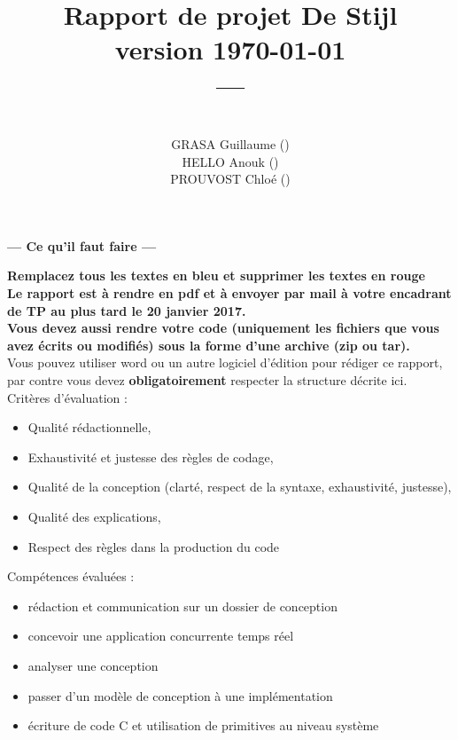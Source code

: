 \documentclass[11pt, a4paper]{paper}
\title{{\Huge Rapport de projet De Stijl}\\
{\large version \today}\\
---\\
}
\author{\color{black}{ABDELMOUMEN Oussama ()} \\ {GRASA Guillaume ()}\\ {HELLO Anouk ()} \\ {PROUVOST Chloé ()} \\
\color{blue}{Exemple : P.-E. Hladik (conception, robot, rédaction du compte-rendu)}
}
\begin{document}
\maketitle


{\color{red}
\begin{framed}
\begin{center}{\bf\Large --- Ce qu'il faut faire --- } \end{center}

{\bf Remplacez tous les textes en bleu et supprimer les textes en rouge}\\


{\bf Le rapport est à rendre en pdf et à envoyer par mail à votre encadrant de TP au plus tard le 20 janvier 2017.}\\

{\bf Vous devez aussi rendre votre code (uniquement les fichiers que vous avez écrits ou modifiés) sous la forme d'une archive (zip ou tar).}\\

Vous pouvez utiliser word ou un autre logiciel d'édition pour rédiger ce rapport, par contre vous devez  {\bf obligatoirement} respecter la structure décrite ici.\\


Critères d'évaluation :
\begin{itemize}
	\item Qualité rédactionnelle,
	\item Exhaustivité et justesse des règles de codage,
	\item Qualité de la conception (clarté, respect de la syntaxe, exhaustivité, justesse),
	\item Qualité des explications,
	\item Respect des règles dans la production du code\\
\end{itemize}

Compétences évaluées :
\begin{itemize}
	\item rédaction et communication sur un dossier de conception
	\item concevoir une application concurrente temps réel
	\item analyser une conception
	\item passer d'un modèle de conception à une implémentation
	\item écriture de code C et utilisation de primitives au niveau système
\end{itemize}
\end{framed}
}
\end{document}
